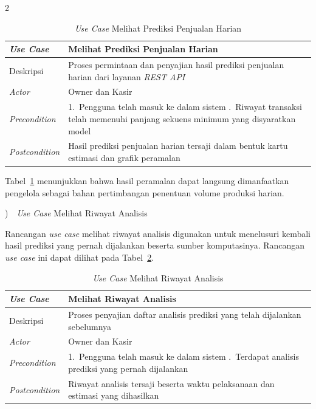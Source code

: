 \documentclass[12pt, a4paper, onecolumn, oneside]{report}
\begin{document}
\begin{spacing}{2}
\begin{table}[H]
\centering
\caption{\textit{Use Case} Melihat Prediksi Penjualan Harian}
\label{tab:uc-prediksi}
\begin{tabularx}{\textwidth}{|p{3.2cm}|X|}
\hline
\textbf{\textit{Use Case}} & \textbf{Melihat Prediksi Penjualan Harian} \\ \hline
Deskripsi & Proses permintaan dan penyajian hasil prediksi penjualan harian dari layanan \textit{REST API} \\ \hline
\textit{Actor} & Owner dan Kasir \\ \hline
\textit{Precondition} & 1.~Pengguna telah masuk ke dalam sistem \newline 2.~Riwayat transaksi telah memenuhi panjang sekuens minimum yang disyaratkan model \\ \hline
\textit{Postcondition} & Hasil prediksi penjualan harian tersaji dalam bentuk kartu estimasi dan grafik peramalan \\ \hline
\end{tabularx}
\end{table}

Tabel~\ref{tab:uc-prediksi} menunjukkan bahwa hasil peramalan dapat langsung dimanfaatkan pengelola sebagai bahan pertimbangan penentuan volume produksi harian.

)~~\textit{Use Case} Melihat Riwayat Analisis

Rancangan \textit{use case} melihat riwayat analisis digunakan untuk menelusuri kembali hasil prediksi yang pernah dijalankan beserta sumber komputasinya. Rancangan \textit{use case} ini dapat dilihat pada Tabel~\ref{tab:uc-riwayatanalisis}.

\begin{table}[H]
\centering
\caption{\textit{Use Case} Melihat Riwayat Analisis}
\label{tab:uc-riwayatanalisis}
\begin{tabularx}{\textwidth}{|p{3.2cm}|X|}
\hline
\textbf{\textit{Use Case}} & \textbf{Melihat Riwayat Analisis} \\ \hline
Deskripsi & Proses penyajian daftar analisis prediksi yang telah dijalankan sebelumnya \\ \hline
\textit{Actor} & Owner dan Kasir \\ \hline
\textit{Precondition} & 1.~Pengguna telah masuk ke dalam sistem \newline 2.~Terdapat analisis prediksi yang pernah dijalankan \\ \hline
\textit{Postcondition} & Riwayat analisis tersaji beserta waktu pelaksanaan dan estimasi yang dihasilkan \\ \hline
\end{tabularx}
\end{table}


\end{spacing}
\end{document}
